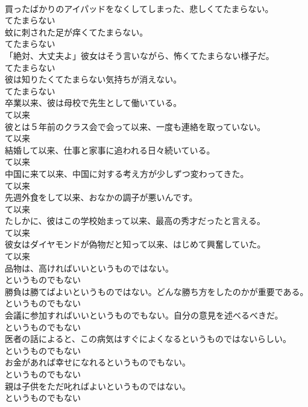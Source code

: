 \documentclass[8pt]{extreport}
\begin{document}
\begin{CJK}{UTF8}{min}
\\	買ったばかりのアイパッドをなくしてしまった、悲しくてたまらない。	
\\	てたまらない	
\\	蚊に刺された足が痒くてたまらない。	
\\	てたまらない	
\\	「絶対、大丈夫よ」彼女はそう言いながら、怖くてたまらない様子だ。	
\\	てたまらない	
\\	彼は知りたくてたまらない気持ちが消えない。	
\\	てたまらない	
\\	卒業以来、彼は母校で先生として働いている。	
\\	て以来	
\\	彼とは５年前のクラス会で会って以来、一度も連絡を取っていない。	
\\	て以来	
\\	結婚して以来、仕事と家事に追われる日々続いている。	
\\	て以来	
\\	中国に来て以来、中国に対する考え方が少しずつ変わってきた。	
\\	て以来	
\\	先週外食をして以来、おなかの調子が悪いんです。	
\\	て以来	
\\	たしかに、彼はこの学校始まって以来、最高の秀才だったと言える。	
\\	て以来	
\\	彼女はダイヤモンドが偽物だと知って以来、はじめて興奮していた。	
\\	て以来	
\\	品物は、高ければいいというものではない。	
\\	というものでもない	
\\	勝負は勝てばよいというものではない。どんな勝ち方をしたのかが重要である。	
\\	というものでもない	
\\	会議に参加すればいいというものでもない。自分の意見を述べるべきだ。	
\\	というものでもない	
\\	医者の話によると、この病気はすぐによくなるというものではないらしい。	
\\	というものでもない	
\\	お金があれば幸せになれるというものでもない。	
\\	というものでもない	
\\	親は子供をただ叱ればよいというものではない。	
\\	というものでもない	

\end{CJK}
\end{document}
